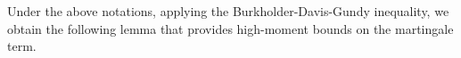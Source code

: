\begin{definition}


\end{definition}

 


Under the above notations, applying the Burkholder-Davis-Gundy inequality, we obtain the following lemma that provides high-moment bounds on the martingale term. %


